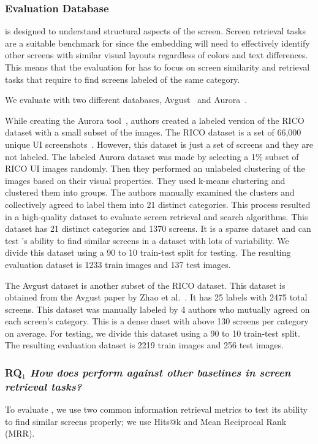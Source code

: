 \subsubsection{{\FRAME Evaluation Database}}
\FRAME is designed to understand structural aspects of the screen. Screen retrieval tasks are a suitable benchmark for \FRAME since the embedding will need to effectively identify other screens with similar visual layouts regardless of colors and text differences. This means that the evaluation for \FRAME has to focus on screen similarity and retrieval tasks that require \FRAME to find screens labeled of the same category. 

We evaluate \FRAME with two different databases, Avgust~\cite{Avgust} and Aurora~\cite{khan24}. 

While creating the Aurora tool~\cite{khan24}, authors created a labeled version of the RICO dataset with a small subset of the images. The RICO dataset is a set of 66,000 unique UI screenshots~\cite{Rico}. However, this dataset is just a set of screens and they are not labeled. The labeled Aurora dataset was made by selecting a 1\% subset of RICO UI images randomly. Then they performed an unlabeled clustering of the images based on their visual properties. They used k-means clustering and clustered them into groups. The authors manually examined the clusters and collectively agreed to label them into 21 distinct categories. This process resulted in a high-quality dataset to evaluate screen retrieval and search algorithms. This dataset has 21 distinct categories and 1370 screens. It is a sparse dataset and can test \FRAME's ability to find similar screens in a dataset with lots of variability. We divide this dataset using a 90 to 10 train-test split for testing. The resulting evaluation dataset is 1233 train images and 137 test images. 

The Avgust dataset is another subset of the RICO dataset. This dataset is obtained from the Avgust paper by Zhao et al.~\cite{Zhao:FSE22}. It has 25 labels with 2475 total screens. This dataset was manually labeled by 4 authors who mutually agreed on each screen's category. This is a dense daset with above 130 screens per category on average. For testing, we divide this dataset using a 90 to 10 train-test split. The resulting evaluation dataset is 2219 train images and 256 test images. 


\subsubsection{\textbf{RQ$_1$} \textit{How does \FRAME perform against other baselines in screen retrieval tasks?}}
\label{sec:eval_metrics}
To evaluate \FRAME, we use two common information retrieval metrics to test its ability to find similar screens properly; we use Hits@k and Mean Reciprocal Rank (MRR). 

